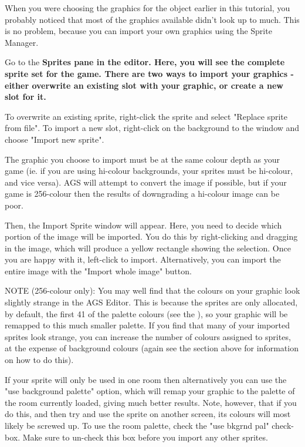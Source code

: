 When you were choosing the graphics for the object earlier in this tutorial,
you probably noticed that most of the graphics available didn't look up to
much. This is no problem, because you can import your own graphics using
the Sprite Manager.

Go to the \bf{Sprites} pane in the editor. Here, you will see
the complete sprite set for the game. There are two ways to import your
graphics - either overwrite an existing slot with your graphic, or
create a new slot for it.

To overwrite an existing sprite, right-click the sprite and select "Replace sprite
from file". To import a new slot, right-click on the background to the window
and choose "Import new sprite".

The graphic you choose to import must be at the same colour depth as your game
(ie. if you are using hi-colour backgrounds, your sprites must be hi-colour,
and vice versa). AGS will attempt to convert the image if possible, but if
your game is 256-colour then the results of downgrading a hi-colour image
can be poor.

Then, the Import Sprite window will appear. Here, you need to decide which portion
of the image will be imported. You do this by right-clicking and dragging in the
image, which will produce a yellow rectangle showing the selection. Once you are
happy with it, left-click to import.
Alternatively, you can import the entire image with the "Import whole image" button.

\it{NOTE (256-colour only):
You may well find that the colours on your graphic look slightly strange in
the AGS Editor. This is because the sprites are only allocated, by default,
the first 41 of the palette colours (see the ), so
your graphic will be remapped to this much smaller palette. If you find that
many of your imported sprites look strange, you can increase the number of
colours assigned to sprites, at the expense of background colours (again see
the section above for information on how to do this).

If your sprite will only be used in one room then alternatively you can
use the "use background palette" option, which will remap your graphic to
the palette of the room currently loaded, giving much better results. Note,
however, that if you do this, and then try and use the sprite on another
screen, its colours will most likely be screwed up. To use the room palette,
check the "use bkgrnd pal" check-box. Make sure to un-check this box before
you import any other sprites.}

